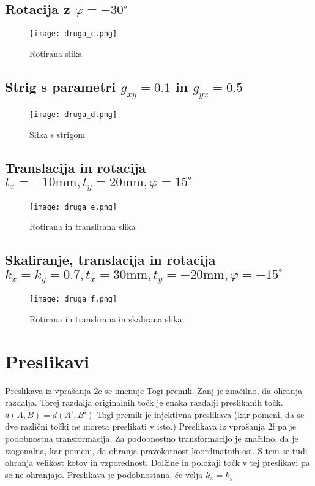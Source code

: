 \documentclass[12pt,a4paper]{article}
\begin{document}
\subsection{Rotacija z $\varphi = -30^\circ$}
\begin{figure}[h!]
  \begin{center}
    \texttt{[image: druga\_c.png]}
    \caption{Rotirana slika}
  \end{center}
\end{figure}
\pagebreak
\subsection{Strig s parametri $g_{xy} = 0.1$ in $g_{yx} = 0.5$}
\begin{figure}[h!]
  \begin{center}
    \texttt{[image: druga\_d.png]}
    \caption{Slika s strigom}

  \end{center}
\end{figure}
\subsection{ Translacija in rotacija $t_x = -10\text{mm}, t_y = 20\text{mm}, \varphi = 15^\circ$}
\begin{figure}[h!]
  \begin{center}
    \texttt{[image: druga\_e.png]}
    \caption{Rotirana in translirana slika}

  \end{center}
\end{figure}
\pagebreak
\subsection{Skaliranje, translacija in rotacija $k_x = k_y = 0.7, t_x = 30\text{mm}, t_y = -20\text{mm}, \varphi = -15^\circ$}

\begin{figure}[h!]
  \begin{center}
    \texttt{[image: druga\_f.png]}
    \caption{Rotirana in translirana in skalirana slika}

  \end{center}
\end{figure}

\section{Preslikavi}
Preslikava iz vprašanja 2e se imenuje Togi premik. Zanj je značilno, da ohranja razdalja. Torej razdalja originalnih točk je enaka razdalji preslikanih točk. $d(A,B) = d(A',B')$ Togi premik je injektivna preslikava (kar pomeni, da se dve različni točki ne moreta preslikati v isto.)
Preslikava iz vprašanja 2f pa je podobnostna transformacija. Za podobnostno transformacijo je značilno, da je izogonalna, kar pomeni, da ohranja pravokotnost koordinatnih osi. S tem se tudi ohranja velikost kotov in vzporednost. Dolžine in položaji točk v tej preslikavi pa se ne ohranjajo. 
Preslikava je podobnostana, če velja $k_x = k_y$
\pagebreak
\end{document}
